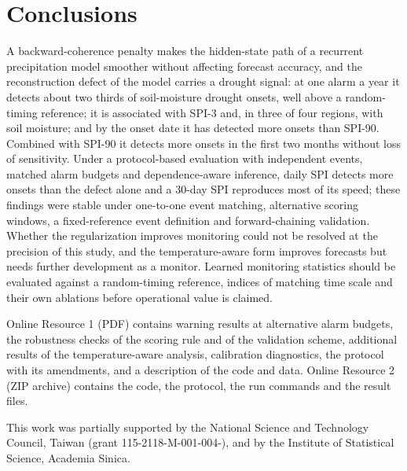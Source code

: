\documentclass[pdflatex,sn-mathphys-ay]{sn-jnl}
\theoremstyle{thmstyletwo}
\begin{document}
\section{Conclusions}\label{sec:conclusion}
A backward-coherence penalty makes the hidden-state path of a recurrent precipitation model smoother
without affecting forecast accuracy, and the reconstruction defect of the model carries a drought
signal: at one alarm a year it detects about two thirds of soil-moisture drought onsets, well above a
random-timing reference; it is associated with SPI-3 and, in three of four regions, with soil moisture;
and by the onset date it has detected more onsets than SPI-90. Combined with SPI-90 it detects more
onsets in the first two months without loss of sensitivity. Under a protocol-based evaluation with independent events, matched alarm
budgets and dependence-aware inference, daily SPI detects more onsets than the defect alone and a 30-day
SPI reproduces most of its speed; these findings were stable under one-to-one event matching,
alternative scoring windows, a fixed-reference event definition and forward-chaining validation. Whether
the regularization improves
monitoring could not be resolved at the precision of this study, and the temperature-aware form improves
forecasts but needs further development as a monitor. Learned monitoring statistics should be evaluated
against a random-timing reference, indices of matching time scale and their own ablations before
operational value is claimed.

\FloatBarrier
\backmatter

Online Resource 1 (PDF) contains warning results at alternative alarm budgets, the robustness checks of
the scoring rule and of the validation scheme, additional results of the temperature-aware analysis,
calibration diagnostics, the protocol with its amendments, and a description of the code and data.
Online Resource 2 (ZIP archive) contains the code, the protocol, the run commands and the result files.

This work was partially supported by the National Science and Technology Council, Taiwan (grant
115-2118-M-001-004-), and by the Institute of Statistical Science, Academia Sinica.
\end{document}
